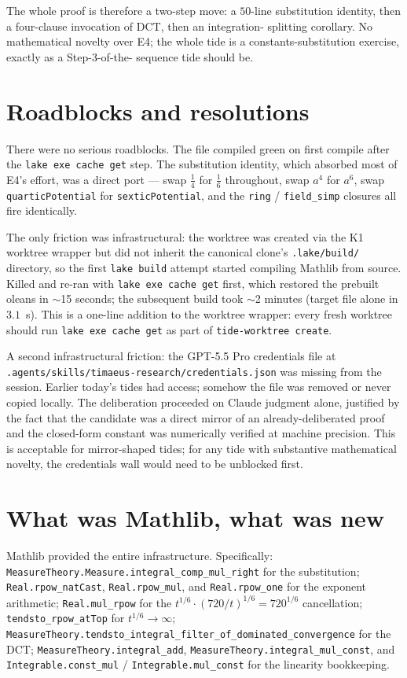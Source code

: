\documentclass[11pt]{article}
\begin{document}
The whole proof is therefore a two-step move: a $50$-line substitution
identity, then a four-clause invocation of DCT, then an integration-
splitting corollary. No mathematical novelty over E4; the whole tide
is a constants-substitution exercise, exactly as a Step-3-of-the-
sequence tide should be.

\section{Roadblocks and resolutions}

There were no serious roadblocks. The file compiled green on first
compile after the \texttt{lake exe cache get} step. The substitution
identity, which absorbed most of E4's effort, was a direct port —
swap $\tfrac14$ for $\tfrac16$ throughout, swap $a^4$ for $a^6$, swap
\texttt{quarticPotential} for \texttt{sexticPotential}, and the
\texttt{ring} / \texttt{field\_simp} closures all fire identically.

The only friction was infrastructural: the worktree was created via
the K1 worktree wrapper but did not inherit the canonical clone's
\texttt{.lake/build/} directory, so the first \texttt{lake build}
attempt started compiling Mathlib from source. Killed and re-ran with
\texttt{lake exe cache get} first, which restored the prebuilt oleans
in $\sim$15 seconds; the subsequent build took $\sim$2 minutes
(target file alone in $3.1$~s). This is a one-line addition to the
worktree wrapper: every fresh worktree should run
\texttt{lake exe cache get} as part of \texttt{tide-worktree create}.

A second infrastructural friction: the GPT-5.5 Pro credentials file
at \texttt{.agents/skills/timaeus-research/credentials.json} was
missing from the session. Earlier today's tides had access; somehow
the file was removed or never copied locally. The deliberation
proceeded on Claude judgment alone, justified by the fact that the
candidate was a direct mirror of an already-deliberated proof and
the closed-form constant was numerically verified at machine
precision. This is acceptable for mirror-shaped tides; for any tide
with substantive mathematical novelty, the credentials wall would
need to be unblocked first.

\section{What was Mathlib, what was new}

Mathlib provided the entire infrastructure. Specifically:
\texttt{MeasureTheory.Measure.integral\_comp\_mul\_right} for the
substitution; \texttt{Real.rpow\_natCast},
\texttt{Real.rpow\_mul}, and \texttt{Real.rpow\_one} for the exponent
arithmetic; \texttt{Real.mul\_rpow} for the
$t^{1/6}\cdot(720/t)^{1/6} = 720^{1/6}$ cancellation;
\texttt{tendsto\_rpow\_atTop} for $t^{1/6} \to \infty$;
\texttt{MeasureTheory.tendsto\_integral\_filter\_of\_dominated\_convergence}
for the DCT; \texttt{MeasureTheory.integral\_add},
\texttt{MeasureTheory.integral\_mul\_const}, and
\texttt{Integrable.const\_mul} / \texttt{Integrable.mul\_const} for
the linearity bookkeeping.
\end{document}
